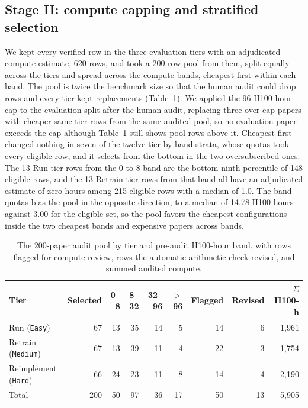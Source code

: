 \subsection{Stage II: compute capping and stratified selection}
\label{app:selection}

We kept every verified row in the three evaluation tiers with an adjudicated
compute estimate, 620 rows, and took a 200-row pool from them, split equally
across the tiers and spread across the compute bands, cheapest first within
each band. The pool is twice the benchmark size so that the human audit could
drop rows and every tier kept replacements (Table~\ref{tab:audit-pool}). We
applied the 96 H100-hour cap to the evaluation split after the human audit,
replacing three over-cap papers with cheaper same-tier rows from the same
audited pool, so no evaluation paper exceeds the cap although
Table~\ref{tab:audit-pool} still shows pool rows above it. Cheapest-first
changed nothing in seven of the twelve tier-by-band strata, whose quotas took
every eligible row, and it selects from the bottom in the two oversubscribed
ones. The 13 Run-tier rows from the 0 to 8 band are the bottom ninth percentile
of 148 eligible rows, and the 13 Retrain-tier rows from that band all have an
adjudicated estimate of zero hours among 215 eligible rows with a median of
1.0. The band quotas bias the pool in the opposite direction, to a median of
14.78 H100-hours against 3.00 for the eligible set, so the pool favors the
cheapest configurations inside the two cheapest bands and expensive papers
across bands.

\begin{table}[!ht]
\centering
\small
\begin{tabular}{@{}lrrrrrrrr@{}}
\toprule
Tier & Selected & 0--8 & 8--32 & 32--96 & $>$96 & Flagged & Revised & $\Sigma$
H100-h \\
\midrule
Run (\texttt{Easy})          & 67 & 13 & 35 & 14 & 5 & 14 & 6 & 1,961 \\
Retrain (\texttt{Medium})    & 67 & 13 & 39 & 11 & 4 & 22 & 3 & 1,754 \\
Reimplement (\texttt{Hard})  & 66 & 24 & 23 & 11 & 8 & 14 & 4 & 2,190 \\
\midrule
Total & 200 & 50 & 97 & 36 & 17 & 50 & 13 & 5,905 \\
\bottomrule
\end{tabular}
\caption{The 200-paper audit pool by tier and pre-audit H100-hour band, with
rows flagged for compute review, rows the automatic arithmetic check revised,
and summed audited compute.}
\label{tab:audit-pool}
\end{table}


